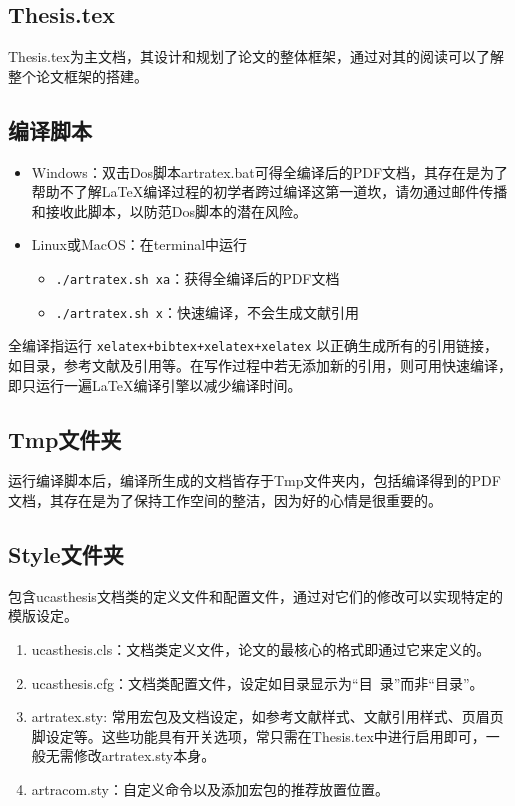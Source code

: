 \subsection{Thesis.tex}

Thesis.tex为主文档，其设计和规划了论文的整体框架，通过对其的阅读可以了解整个论文框架的搭建。

\subsection{编译脚本}

\begin{itemize}
    \item Windows：双击Dos脚本artratex.bat可得全编译后的PDF文档，其存在是为了帮助不了解\LaTeX{}编译过程的初学者跨过编译这第一道坎，请勿通过邮件传播和接收此脚本，以防范Dos脚本的潜在风险。
    \item Linux或MacOS：在terminal中运行
    \begin{itemize}
        \item \verb|./artratex.sh xa|：获得全编译后的PDF文档
        \item \verb|./artratex.sh x|：快速编译，不会生成文献引用
    \end{itemize}
\end{itemize}

全编译指运行 \verb|xelatex+bibtex+xelatex+xelatex| 以正确生成所有的引用链接，如目录，参考文献及引用等。在写作过程中若无添加新的引用，则可用快速编译，即只运行一遍\LaTeX{}编译引擎以减少编译时间。

\subsection{Tmp文件夹}

运行编译脚本后，编译所生成的文档皆存于Tmp文件夹内，包括编译得到的PDF文档，其存在是为了保持工作空间的整洁，因为好的心情是很重要的。

\subsection{Style文件夹}

包含ucasthesis文档类的定义文件和配置文件，通过对它们的修改可以实现特定的模版设定。

\begin{enumerate}
    \item ucasthesis.cls：文档类定义文件，论文的最核心的格式即通过它来定义的。
    \item ucasthesis.cfg：文档类配置文件，设定如目录显示为“目~录”而非“目录”。
    \item artratex.sty: 常用宏包及文档设定，如参考文献样式、文献引用样式、页眉页脚设定等。这些功能具有开关选项，常只需在Thesis.tex中进行启用即可，一般无需修改artratex.sty本身。
    \item artracom.sty：自定义命令以及添加宏包的推荐放置位置。
\end{enumerate}

